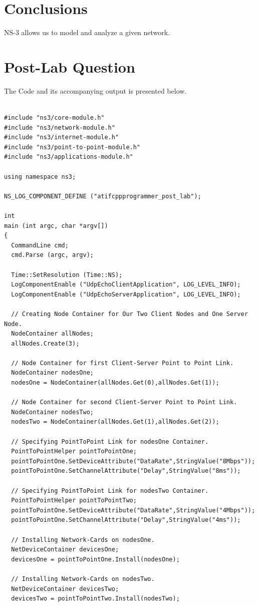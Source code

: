 \documentclass[fullpage]{article}
\begin{document}
\section{Conclusions}
NS-3 allows us to model and analyze a given network.

\section{Post-Lab Question}
The Code and its accompanying output is presented below.
\begin{verbatim}

#include "ns3/core-module.h"
#include "ns3/network-module.h"
#include "ns3/internet-module.h"
#include "ns3/point-to-point-module.h"
#include "ns3/applications-module.h"

using namespace ns3;

NS_LOG_COMPONENT_DEFINE ("atifcppprogrammer_post_lab");

int
main (int argc, char *argv[])
{
  CommandLine cmd;
  cmd.Parse (argc, argv);

  Time::SetResolution (Time::NS);
  LogComponentEnable ("UdpEchoClientApplication", LOG_LEVEL_INFO);
  LogComponentEnable ("UdpEchoServerApplication", LOG_LEVEL_INFO);

  // Creating Node Container for Our Two Client Nodes and One Server Node.
  NodeContainer allNodes;
  allNodes.Create(3);

  // Node Container for first Client-Server Point to Point Link.
  NodeContainer nodesOne;
  nodesOne = NodeContainer(allNodes.Get(0),allNodes.Get(1));

  // Node Container for second Client-Server Point to Point Link.
  NodeContainer nodesTwo;
  nodesTwo = NodeContainer(allNodes.Get(1),allNodes.Get(2));

  // Specifying PointToPoint Link for nodesOne Container.
  PointToPointHelper pointToPointOne;
  pointToPointOne.SetDeviceAttribute("DataRate",StringValue("8Mbps"));
  pointToPointOne.SetChannelAttribute("Delay",StringValue("8ms"));

  // Specifying PointToPoint Link for nodesTwo Container.
  PointToPointHelper pointToPointTwo;
  pointToPointOne.SetDeviceAttribute("DataRate",StringValue("4Mbps"));
  pointToPointOne.SetChannelAttribute("Delay",StringValue("4ms"));

  // Installing Network-Cards on nodesOne.
  NetDeviceContainer devicesOne;
  devicesOne = pointToPointOne.Install(nodesOne);

  // Installing Network-Cards on nodesTwo.
  NetDeviceContainer devicesTwo;
  devicesTwo = pointToPointTwo.Install(nodesTwo);


\end{verbatim}
\end{document}
